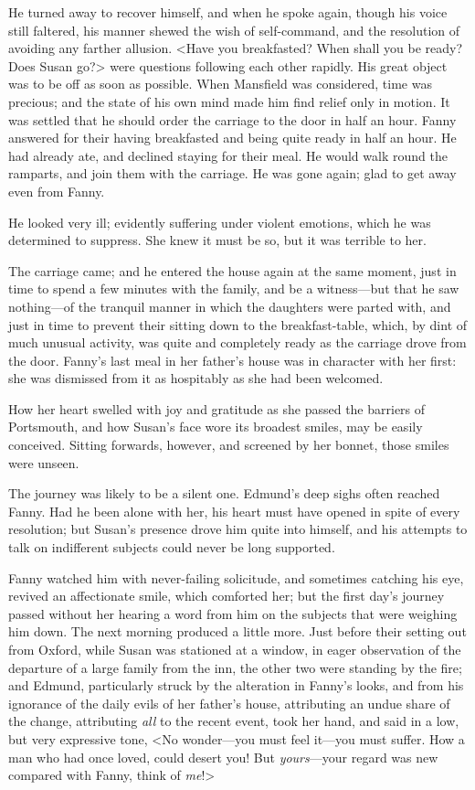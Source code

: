 He turned away to recover himself, and when he spoke again, though his voice still faltered, his manner shewed the wish of self-command, and the resolution of avoiding any farther allusion. <Have you breakfasted? When shall you be ready? Does Susan go?> were questions following each other rapidly. His great object was to be off as soon as possible. When Mansfield was considered, time was precious; and the state of his own mind made him find relief only in motion. It was settled that he should order the carriage to the door in half an hour. Fanny answered for their having breakfasted and being quite ready in half an hour. He had already ate, and declined staying for their meal. He would walk round the ramparts, and join them with the carriage. He was gone again; glad to get away even from Fanny.

He looked very ill; evidently suffering under violent emotions, which he was determined to suppress. She knew it must be so, but it was terrible to her.

The carriage came; and he entered the house again at the same moment, just in time to spend a few minutes with the family, and be a witness—but that he saw nothing—of the tranquil manner in which the daughters were parted with, and just in time to prevent their sitting down to the breakfast-table, which, by dint of much unusual activity, was quite and completely ready as the carriage drove from the door. Fanny's last meal in her father's house was in character with her first: she was dismissed from it as hospitably as she had been welcomed.

How her heart swelled with joy and gratitude as she passed the barriers of Portsmouth, and how Susan's face wore its broadest smiles, may be easily conceived. Sitting forwards, however, and screened by her bonnet, those smiles were unseen.

The journey was likely to be a silent one. Edmund's deep sighs often reached Fanny. Had he been alone with her, his heart must have opened in spite of every resolution; but Susan's presence drove him quite into himself, and his attempts to talk on indifferent subjects could never be long supported.

Fanny watched him with never-failing solicitude, and sometimes catching his eye, revived an affectionate smile, which comforted her; but the first day's journey passed without her hearing a word from him on the subjects that were weighing him down. The next morning produced a little more. Just before their setting out from Oxford, while Susan was stationed at a window, in eager observation of the departure of a large family from the inn, the other two were standing by the fire; and Edmund, particularly struck by the alteration in Fanny's looks, and from his ignorance of the daily evils of her father's house, attributing an undue share of the change, attributing \textit{all}  to the recent event, took her hand, and said in a low, but very expressive tone, <No wonder—you must feel it—you must suffer. How a man who had once loved, could desert you! But \textit{yours}—your regard was new compared with \doubleemdash Fanny, think of \textit{me}!>

